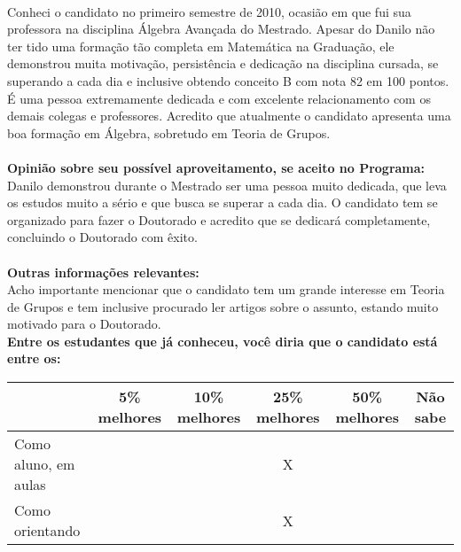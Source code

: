 \documentclass[11pt]{article}
\begin{document}
\\Conheci o candidato no primeiro semestre de 2010, ocasião em que fui sua professora na disciplina Álgebra Avançada do Mestrado. Apesar do Danilo não ter tido uma formação tão completa em Matemática na Graduação, ele demonstrou muita motivação, persistência e dedicação na disciplina cursada, se superando a cada dia e inclusive obtendo conceito B com nota 82 em 100 pontos. É uma pessoa extremamente dedicada e com excelente relacionamento com os demais colegas e professores. Acredito que atualmente o candidato apresenta uma boa formação em Álgebra, sobretudo em Teoria de Grupos.\\
\\
\textbf{Opinião sobre seu possível aproveitamento, se aceito no Programa:}
\\Danilo demonstrou durante o Mestrado ser uma pessoa muito dedicada, que leva os estudos muito a sério e que busca se superar a cada dia. O candidato tem se organizado para fazer o Doutorado e acredito que se dedicará completamente, concluindo o Doutorado com êxito.\\ 
\\
\textbf{Outras informações relevantes:} \\Acho importante mencionar que o candidato tem um grande interesse em Teoria de Grupos e tem inclusive procurado ler artigos sobre o assunto, estando muito motivado para o Doutorado.
\\[0.3cm]
\textbf{Entre os estudantes que já conheceu, você diria que o candidato está entre os:}
\\
\begin{tabular}{|l|c|c|c|c|c|}
\hline
 & 5\% melhores & 10\% melhores & 25\% melhores & 50\% melhores & Não sabe \\
\hline
Como aluno, em aulas &  &  & X &  & \\
\hline
Como orientando &  &  & X &  & \\
\hline
\end{tabular}
\end{document}
